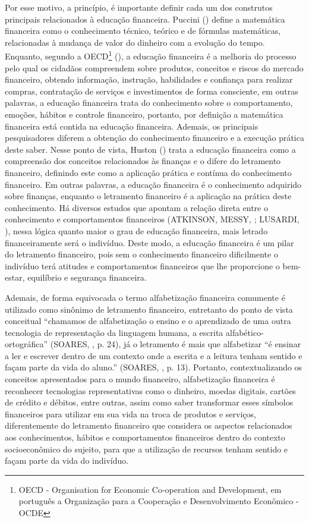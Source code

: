 Por esse motivo, a princípio, é importante definir cada um dos construtos principais relacionados à educação financeira. Puccini (\citeyear{puccini2011}) define a matemática financeira como o conhecimento técnico, teórico e de fórmulas matemáticas, relacionadas à mudança de valor do dinheiro com a evolução do tempo. Enquanto, segundo a OECD\footnote{OECD - Organisation for Economic Co-operation and Development, em português a Organização para a Cooperação e Desenvolvimento Econômico - OCDE} (\citeyear{oecd2005}), a educação financeira é a melhoria do processo pelo qual os cidadãos compreendem sobre produtos, conceitos e riscos do mercado financeiro, obtendo informação, instrução, habilidades e confiança para realizar compras, contratação de serviços e investimentos de forma consciente, em outras palavras, a educação financeira trata do conhecimento sobre o comportamento, emoções, hábitos e controle financeiro, portanto, por definição a matemática financeira está contida na educação financeira. Ademais, os principais pesquisadores diferem a obtenção do conhecimento financeiro e a execução prática deste saber. Nesse ponto de vista, Huston (\citeyear{huston2010}) trata a educação financeira como a compreensão dos conceitos relacionados às finanças e o difere do letramento financeiro, definindo este como a aplicação prática e contínua do conhecimento financeiro. Em outras palavras, a educação financeira é o conhecimento adquirido sobre finanças, enquanto o letramento financeiro é a aplicação na prática deste conhecimento. Há diversos estudos que apontam a relação direta entre o conhecimento e comportamentos financeiros (ATKINSON, MESSY, \citeyear{atkinson2012}; LUSARDI, \citeyear{lusardi2015}), nessa lógica quanto maior o grau de educação financeira, mais letrado financeiramente será o indivíduo. Deste modo, a educação financeira é um pilar do letramento financeiro, pois sem o conhecimento financeiro dificilmente o indivíduo terá atitudes e comportamentos financeiros que lhe proporcione o bem-estar, equilíbrio e segurança financeira.

Ademais, de forma equivocada o termo alfabetização financeira comumente é utilizado como sinônimo de letramento financeiro, entretanto do ponto de vista conceitual “chamamos de alfabetização o ensino e o aprendizado de uma outra tecnologia de representação da linguagem humana, a escrita alfabético-ortográfica” (SOARES, \citeyear{soares2005}, p. 24), já o letramento é mais que alfabetizar “é ensinar a ler e escrever dentro de um contexto onde a escrita e a leitura tenham sentido e façam parte da vida do aluno.” (SOARES, \citeyear{soares2002}, p. 13). Portanto, contextualizando os conceitos apresentados para o mundo financeiro, alfabetização financeira é reconhecer tecnologias representativas como o dinheiro, moedas digitais, cartões de crédito e débitos, entre outras, assim como saber transformar esses símbolos financeiros para utilizar em sua vida na troca de produtos e serviços, diferentemente do letramento financeiro que considera os aspectos relacionados aos conhecimentos, hábitos e comportamentos financeiros dentro do contexto socioeconômico do sujeito, para que a utilização de recursos tenham sentido e façam parte da vida do indivíduo.

